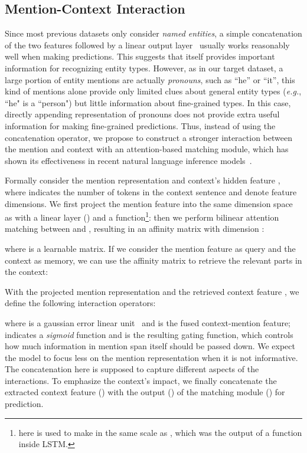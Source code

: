 \documentclass[11pt,a4paper]{article}
\begin{document}
\subsection{Mention-Context Interaction}
\label{inter}
Since most previous datasets only consider \textit{named entities}, a simple concatenation of the two features  followed by a linear output layer~\cite{shimaoka2016attentive,shimaoka2016neural} usually works reasonably well when making predictions. This suggests that  itself provides important information for recognizing entity types. However, as in our target dataset, a large portion of entity mentions are actually \textit{pronouns}, such as ``he'' or ``it'', this kind of mentions alone provide only limited clues about general entity types (\emph{e.g.}, ``he" is a ``person") but little information about fine-grained types. In this case, directly appending representation of pronouns does not provide extra useful information for making fine-grained predictions. Thus, instead of using the concatenation operator, we propose to construct a stronger interaction between the mention and context with an attention-based matching module, which has shown its effectiveness in recent natural language inference models~\cite{P16-2022,P17-1152}. 

Formally consider the mention representation  and context's hidden feature , where  indicates the number of tokens in the context sentence and  denote feature dimensions. We first project the mention feature  into the same dimension space as  with a linear layer () and a  function\footnote{ here is used to make  in the same scale as , which was the output of a  function inside LSTM.}:
 then we perform bilinear attention matching between  and , resulting in an affinity matrix  with dimension :

where  is a learnable matrix. If we consider the mention feature as query and the context as memory, we can use the affinity matrix to retrieve the relevant parts in the context:

With the projected mention representation  and the retrieved context feature , we define the following interaction operators:

where  is a gaussian error linear unit~\cite{gelu} and  is the fused context-mention feature;  indicates a \textit{sigmoid} function and  is the resulting gating function, which controls how much information in mention span itself should be passed down. We expect the model to focus less on the mention representation when it is not informative. The concatenation  here is supposed to capture different aspects of the interactions. To emphasize the context's impact, we finally concatenate the extracted context feature () with the output () of the matching module () for prediction.
\end{document}
